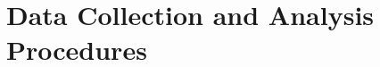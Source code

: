 \begin{comment}
The influence of system-level configuration options was also examined. Keystone offers various compile-time and runtime flags that affect behavior and performance, most notably the debug mode. When enabled, debug mode activates additional runtime checks, logging mechanisms, and diagnostic outputs intended to aid developers during enclave development and testing. These features, while useful during implementation, introduce measurable overhead. By executing benchmarks with and without debug mode enabled, the experiments were able to quantify the cost of enhanced observability and determine whether such features significantly degrade performance.

Memory allocation parameters were also varied to understand their role in shaping enclave performance. In particular, the heap and stack sizes assigned to benchmarks were adjusted to evaluate the sensitivity of the system to memory layout and availability. This was particularly relevant for CoreMark, which dynamically allocates and manipulates internal data structures. Larger memory allocations could potentially lead to increased cache pressure or page faults within the enclave, highlighting the importance of efficient memory management in TEE contexts.

Measurement accuracy was further reinforced by cross-validating timing results. Execution time was captured using both the benchmarks’ internal timing functions and QEMU’s emulated timer infrastructure. This dual-timing approach ensured that timing results were not distorted by emulator artifacts or low-resolution timers. In cases where discrepancies were observed, additional investigation was conducted to determine the root cause, and only consistent, corroborated results were included in the final analysis.

Finally, to explore the potential impact of system-level contention, a set of exploratory experiments introduced artificial background load during native execution. Although Keystone enclaves currently operate in a single-threaded, non-preemptive mode, testing under load offered preliminary insights into how enclave performance might be influenced in future multi-threaded or multi-tenant scenarios, especially in shared virtualized environments. While these tests were not a primary focus of the evaluation, they provided valuable context for interpreting variability in the results.
\end{comment}

\section{Data Collection and Analysis Procedures}